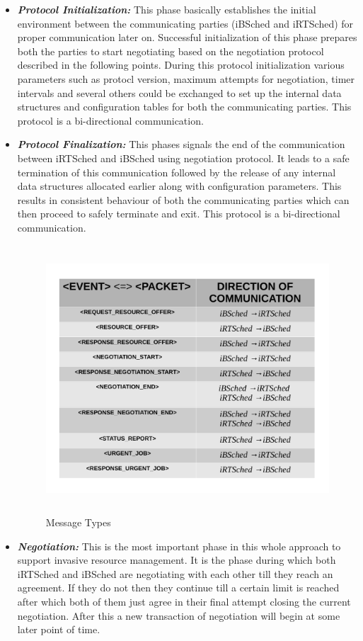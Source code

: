 \begin{itemize}
\item \textbf{\textit{Protocol Initialization:}} This phase basically establishes the initial environment between the communicating parties (iBSched and iRTSched) for proper communication later on. Successful initialization of this phase prepares both the parties to start negotiating based on the negotiation protocol described in the following points. During this protocol initialization various parameters such as protocl version, maximum attempts for negotiation, timer intervals and several others could be exchanged to set up the internal data structures and configuration tables for both the communicating parties. This protocol is a bi-directional communication.
\item \textbf{\textit{Protocol Finalization:}} This phases signals the end of the communication between iRTSched and iBSched using negotiation protocol. It leads to a safe termination of this communication followed by the release of any internal data structures allocated earlier along with configuration parameters. This results in consistent behaviour of both the communicating parties which can then proceed to safely terminate and exit. This protocol is a bi-directional communication.
\begin{figure}[h]
\centering
\includegraphics[width=1.0\textwidth, height=100mm]{./figures/table.pdf}
\caption{Message Types}
\label{fig:8}
\end{figure}
\item \textbf{\textit{Negotiation:}} This is the most important phase in this whole approach to support invasive resource management. It is the phase during which both iRTSched and iBSched are negotiating with each other till they reach an agreement. If they do not then they continue till a certain limit is reached after which both of them just agree in their final attempt closing the current negotiation. After this a new transaction of negotiation will begin at some later point of time.

\end{itemize}
